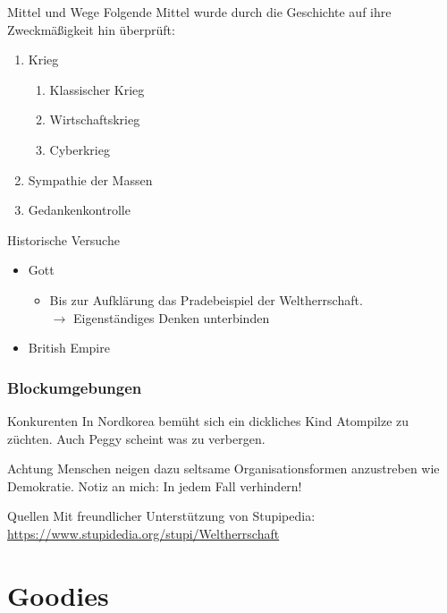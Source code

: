 \documentclass[11pt]{beamer}
\begin{document}
\begin{frame}{Mittel und Wege}
Folgende Mittel wurde durch die Geschichte auf ihre Zweckmäßigkeit hin überprüft:
\begin{enumerate}
	\item Krieg
	\begin{enumerate}
		\item Klassischer Krieg
		\item Wirtschaftskrieg
		\item Cyberkrieg
	\end{enumerate}
	\item Sympathie der Massen
	\item Gedankenkontrolle
\end{enumerate}
\end{frame}
\begin{frame}{Historische Versuche}
\begin{itemize}
\item Gott
\begin{itemize}
	\item Bis zur Aufklärung das Pradebeispiel der Weltherrschaft.\\ $\rightarrow$ Eigenständiges Denken unterbinden
\end{itemize}
\item British Empire
\end{itemize}
\end{frame}
\begin{frame}
\frametitle{Blockumgebungen}
\begin{block}{Konkurenten}
	In Nordkorea bemüht sich ein dickliches Kind Atompilze zu züchten. Auch Peggy scheint was zu verbergen.
\end{block}
\begin{alertblock}{Achtung}
	Menschen neigen dazu seltsame Organisationsformen anzustreben wie Demokratie. Notiz an mich: In jedem Fall verhindern!
\end{alertblock}
\begin{exampleblock}{Quellen}
Mit freundlicher Unterstützung von Stupipedia:\\
\url{https://www.stupidedia.org/stupi/Weltherrschaft}
\end{exampleblock}

\end{frame}
\section{Goodies}
\end{document}

